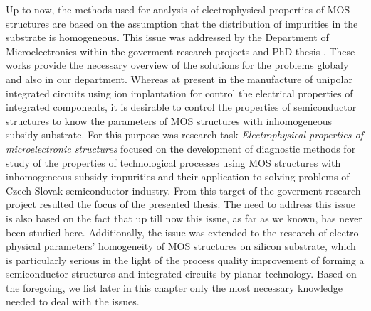 Up to now, the methods used for analysis of electrophysical properties
of MOS structures are based on the assumption that the distribution of
impurities in the substrate is homogeneous. This issue was addressed
by the Department of Microelectronics within the goverment research
projects \cite{1.1,1.2} and PhD thesis \cite{1.5,1.6,1.7,1.8}. These
works provide the necessary overview of the solutions for the problems
globaly and also in our department. Whereas at present in the
manufacture of unipolar integrated circuits using ion implantation for
control the electrical properties of integrated components, it is
desirable to control the properties of semiconductor structures to
know the parameters of MOS structures with inhomogeneous subsidy
substrate. For this purpose was research task {\em Electrophysical
  properties of microelectronic structures} \cite{1.3,1.4} focused on
the development of diagnostic methods for study of the properties of
technological processes using MOS structures with inhomogeneous
subsidy impurities and their application to solving problems of
Czech-Slovak semiconductor industry. From this target of the goverment
research project resulted the focus of the presented thesis. The need
to address this issue is also based on the fact that up till now this
issue, as far as we known, has never been studied here. Additionally,
the issue was extended to the research of electro-physical parameters'
homogeneity of MOS structures on silicon substrate, which is
particularly serious in the light of the process quality improvement
of forming a semiconductor structures and integrated circuits by
planar technology. Based on the foregoing, we list later in this
chapter only the most necessary knowledge needed to deal with the
issues.

\iffalse
\section{Základné poznatky o štruktúre MOS.}
Štruktúra MOS tvorí jednoduchú testovaciu štruktúru, ktorej meraním
možno skúmať skoro všetky jej elektrické vlastnosti. Výhodnosť
štruktúry MOS spočíva v jednoduchosti jej výroby a jednoduchosti
analýzy jej vlastností. Jednoduchosť analýzy vyplýva z toho, že
analyzovaný systém je v tepelnej rovnováhe a zároveň
jednodimenzionálny prístup je pre väčšinu javov dostatočne
presný. Elektrickými meraniami štruktúry MOS možno skúmať vlastnosti
objemu $SiO_2$, jeho rozhrania s polovodičom a kovom, ako aj
vlastnosti podpovrchovej oblasti polovodiča.
\fi

